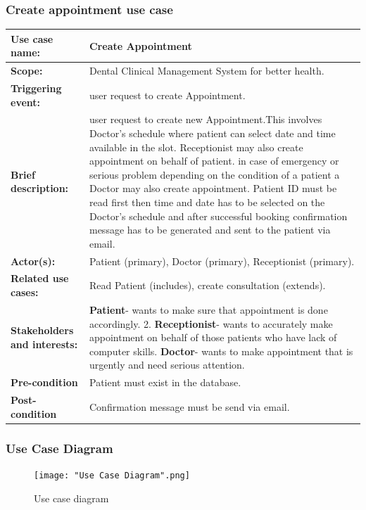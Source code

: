 \documentclass[11 pt]{article}
\begin{document}
\subsubsection{Create appointment use case}
\begin{tabular}{|p{3cm}|p{9cm}|}
\hline
\textbf{Use case name:}& Create Appointment\\
\hline
\textbf{Scope:}& Dental Clinical Management System for better health.\\
\hline
\textbf{Triggering event:}& user request to create Appointment.\\
\hline
\textbf{Brief description:}& user request to create new Appointment.This involves Doctor's schedule where patient can select date and time available in the slot. Receptionist may also create appointment on behalf of patient. in case of emergency or serious problem depending on the condition of a patient a Doctor may also create appointment. Patient ID must be read first then time and date has to be selected on the Doctor's schedule and after successful booking confirmation message has to be generated and sent to the patient via email. \\
\hline
\textbf{Actor(s):}& Patient (primary), Doctor (primary), Receptionist (primary).\\
\hline
\textbf{Related use cases:}& Read Patient (includes), create consultation (extends).\\
\hline
\textbf{Stakeholders and interests:}& \textbf{Patient}- wants to make sure that appointment is done accordingly. 2. \textbf{Receptionist}- wants to accurately make appointment on behalf of those patients who have lack of computer skills. \textbf{Doctor}- wants to make appointment that is urgently and need serious attention. \\
\hline
\textbf{Pre-condition}& Patient must exist in the database.\\
\hline
\textbf{Post-condition}& Confirmation message must be send via email.\\
\hline
\end{tabular}
\newpage
\subsubsection{Use Case Diagram}

\begin{figure}[h]
\centering
\texttt{[image: "Use Case Diagram".png]}
\caption{Use case diagram}
\label{fig:ERD}
\end{figure}
\end{document}
